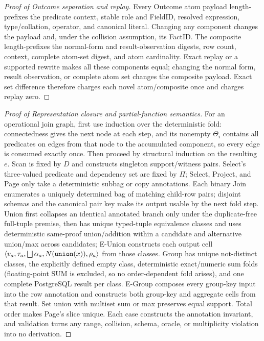 \documentclass[journal,onecolumn]{IEEEtran}
\newcommand{\code}[1]{\texttt{\detokenize{#1}}}
\begin{document}
\begin{proof}[Proof of Outcome separation and replay]
Every Outcome atom payload length-prefixes the predicate context, stable role and
FieldID, resolved expression, type/collation, operator, and canonical literal.
Changing any component changes the payload and, under the collision assumption,
its FactID. The composite length-prefixes the normal-form and result-observation
digests, row count, context, complete atom-set digest, and atom cardinality.
Exact replay or a supported rewrite makes all these components equal; changing
the normal form, result observation, or complete atom set changes the composite
payload. Exact set difference therefore charges each novel atom/composite once
and charges replay zero.
\end{proof}

\begin{proof}[Proof of Representation closure and partial-function semantics]
For an operational join graph, first use induction over the deterministic fold:
connectedness gives the next node at each step, and its nonempty $\Theta_i$
contains all predicates on edges from that node to the accumulated component,
so every edge is consumed exactly once. Then proceed by structural induction
on the resulting $e$. Scan is fixed by $D$ and constructs singleton
support/witness pairs. Select's three-valued predicate and dependency set are
fixed by $\Pi$; Select, Project, and Page only take a deterministic subbag or
copy annotations. Each binary Join enumerates a uniquely determined bag of
matching child-row pairs; disjoint schemas and the canonical pair key make its
output usable by the next fold step. Union first collapses an identical annotated branch only under
the duplicate-free full-tuple premise, then has unique typed-tuple equivalence
classes and uses deterministic same-proof union/addition within a candidate and
alternative union/max across candidates; E-Union constructs each output cell
$\langle v_a,\tau_a,\bigsqcup\alpha_a,N(\code{union}(x)),\rho_a\rangle$ from
those classes. Group has unique not-distinct classes, the explicitly defined
empty class, deterministic exact/numeric sum folds (floating-point SUM is
excluded, so no order-dependent fold arises), and one complete PostgreSQL
result per class. E-Group composes every group-key input into the row annotation
and constructs both group-key and aggregate cells from that result. Set union
with multiset sum or max preserves equal support. Total order makes Page's
slice unique. Each case constructs the annotation invariant, and validation
turns any range, collision, schema, oracle, or multiplicity violation into no
derivation.
\end{proof}
\end{document}
